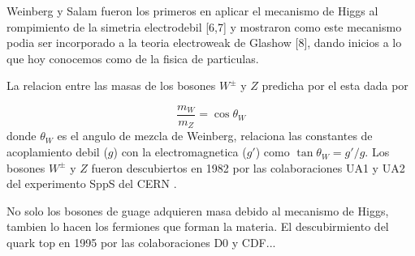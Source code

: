 Weinberg y Salam fueron los primeros en aplicar el mecanismo de Higgs al rompimiento de la
simetria electrodebil [6,7] y mostraron como este mecanismo podia ser incorporado a la teoria
electroweak de Glashow [8], dando inicios a lo que hoy conocemos como {\SM} de la fisica
de particulas.

La relacion entre las masas de los bosones $W^\pm$ y $Z$ predicha por el {\SM} esta dada por

\begin{equation}
  \frac{m_W}{m_Z} = \cos \theta_W
\end{equation}
%
donde $\theta_W$ es el angulo de mezcla de Weinberg, relaciona las constantes de acoplamiento
debil ($g$) con la electromagnetica ($g'$) como  $\tan\theta_W = g'/g$.
Los bosones $W^\pm$ y $Z$ fueron descubiertos en 1982 por las colaboraciones UA1 y UA2 del
experimento SppS del CERN .

No solo los bosones de guage adquieren masa debido al mecanismo de Higgs, tambien lo hacen
los fermiones que forman la materia. El descubirmiento del quark top en 1995 por las colaboraciones
D0 y CDF...






